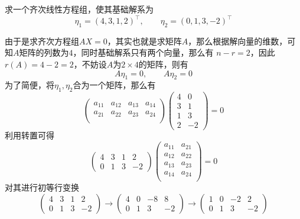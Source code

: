 \begin{example}
    求一个齐次线性方程组，使其基础解系为
    \[ \eta_1 = (4,3,1,2)^\intercal,\qquad \eta_2 = (0,1,3,-2)^\intercal \]
\end{example}
\begin{solution}
    由于是求齐次方程组$AX=0$，其实也就是求矩阵$A$，那么根据解向量的维数，可知$A$矩阵的列数为$4$，同时基础解系只有两个向量，那么有
    $n-r=2$，因此$r(A) = 4-2 = 2$，不妨设$A$为$2\times 4$的矩阵，则有
    \[ A\eta_1 = 0, \qquad A\eta_2 = 0 \]
    为了简便，将$\eta_1,\eta_2$合为一个矩阵，那么有
    \[
        \begin{pmatrix}
            a_{11} & a_{12} & a_{13} & a_{14} \\
            a_{21} & a_{22} & a_{23} & a_{24} \\
        \end{pmatrix}
        \begin{pmatrix}
            4 & 0  \\
            3 & 1  \\
            1 & 3  \\
            2 & -2
        \end{pmatrix}
        =0
    \]
    利用转置可得
    \[
        \begin{pmatrix}
            4 & 3 & 1 & 2  \\
            0 & 1 & 3 & -2
        \end{pmatrix}
        \begin{pmatrix}
            a_{11} & a_{21} \\
            a_{12} & a_{22} \\
            a_{13} & a_{23} \\
            a_{14} & a_{24} \\
        \end{pmatrix}
        =0
    \]
    对其进行初等行变换
    \[
        \begin{pmatrix}
            4 & 3 & 1 & 2  \\
            0 & 1 & 3 & -2
        \end{pmatrix}
        \longrightarrow
        \begin{pmatrix}
            4 & 0 & -8 & 8  \\
            0 & 1 & 3  & -2
        \end{pmatrix}
        \longrightarrow
        \begin{pmatrix}
            1 & 0 & -2 & 2  \\
            0 & 1 & 3  & -2

\end{pmatrix}\]
\end{solution}

